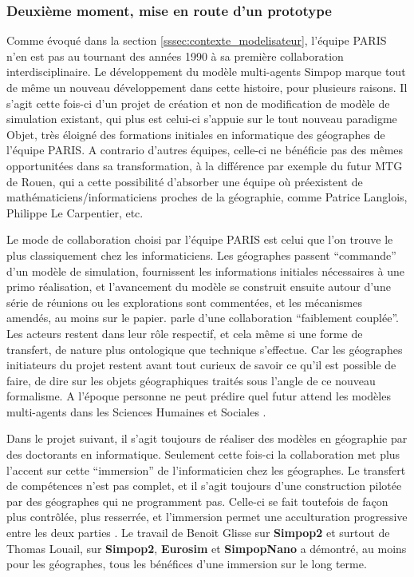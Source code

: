 \subsubsection{Deuxième moment, mise en route d'un prototype}
\label{sssec:deuxieme_moment}

Comme évoqué dans la section \ref{sssec:contexte_modelisateur}, l'équipe PARIS n'en est pas au tournant des années 1990 à sa première collaboration interdisciplinaire. Le développement du modèle multi-agents Simpop \autocites{GuerinPace1993, Bura1995} marque tout de même un nouveau développement dans cette histoire, pour plusieurs raisons. Il s'agit cette fois-ci d'un projet de création et non de modification de modèle de simulation existant, qui plus est celui-ci s'appuie sur le tout nouveau paradigme Objet, très éloigné des formations initiales en informatique des géographes de l'équipe PARIS. A contrario d'autres équipes, celle-ci ne bénéficie pas des mêmes opportunitées dans sa transformation, à la différence par exemple du futur MTG de Rouen, qui a cette possibilité d'absorber  une équipe où préexistent de mathématiciens/informaticiens proches de la géographie, comme Patrice Langlois, Philippe Le Carpentier, etc.

Le mode de collaboration choisi par l'équipe PARIS est celui que l'on trouve le plus classiquement chez les informaticiens. Les géographes passent \enquote{commande} d'un modèle de simulation, fournissent les informations initiales nécessaires à une primo réalisation, et l'avancement du modèle se construit ensuite autour d'une série de réunions ou les explorations sont commentées, et les mécanismes amendés, au moins sur le papier. \textcite[10]{Louail2010} parle d'une collaboration \enquote{faiblement couplée}. Les acteurs restent dans leur rôle respectif, et cela même si une forme de transfert, de nature plus ontologique que technique  s'effectue. Car les géographes initiateurs du projet restent avant tout curieux de savoir ce qu'il est possible de faire, de dire sur les objets géographiques traités sous l'angle de ce nouveau formalisme. A l'époque personne ne peut prédire quel futur attend les modèles multi-agents dans les Sciences Humaines et Sociales . 

Dans le projet suivant, il s'agit toujours de réaliser des modèles en géographie par des doctorants en informatique. Seulement cette fois-ci la collaboration met plus l'accent sur cette \enquote{immersion} de l'informaticien chez les géographes. Le transfert de compétences n'est pas complet, et il s'agit toujours d'une construction pilotée par des géographes qui ne programment pas. Celle-ci se fait toutefois de façon plus contrôlée, plus resserrée, et l'immersion permet une acculturation progressive entre les deux parties \autocite[11]{Louail2010}. Le travail de Benoit Glisse sur \textbf{Simpop2} et surtout de Thomas Louail, sur \textbf{Simpop2}, \textbf{Eurosim} et \textbf{SimpopNano} a démontré, au moins pour les géographes, tous les bénéfices d'une immersion sur le long terme.


